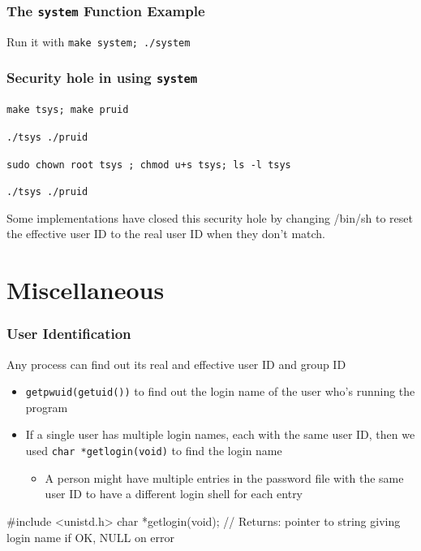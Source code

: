 \documentclass[newPxFont,sthlmFooter,nooffset]{beamer}
\begin{document}
\begin{frame}[containsverbatim,t]
  \frametitle{The \texttt{system} Function Example}
Run it with \texttt{make system; ./system}

\end{frame}

\begin{frame}
  \frametitle{Security hole in using \texttt{system}}
\texttt{make tsys; make pruid}

\texttt{./tsys ./pruid}

\texttt{sudo chown root tsys ; chmod u+s tsys; ls -l tsys}

\texttt{./tsys ./pruid}


\vspace{-0.8em}


{\footnotesize Some implementations have closed this security hole by changing /bin/sh to reset the effective user ID to the real user ID when they don’t match. }
\end{frame}


\section{Miscellaneous}


\begin{frame}[containsverbatim,t]
  \frametitle{User Identification}
Any process can find out its real and effective user ID and group ID
\begin{itemize}
\item \texttt{getpwuid(getuid())} to find out the login name of the user who's running the program
\item If a single user has multiple login names, each with the same user ID, then we used \texttt{char *getlogin(void)} to find the login name
  \begin{itemize}
  \item \footnotesize A person might have multiple entries in the password file with the same user ID to have a different login shell for each entry
  \end{itemize}
\end{itemize}
\begin{codedef}
#include <unistd.h>
char *getlogin(void);
// Returns: pointer to string giving login name if OK, NULL on error
\end{codedef}
\end{frame}
\end{document}
